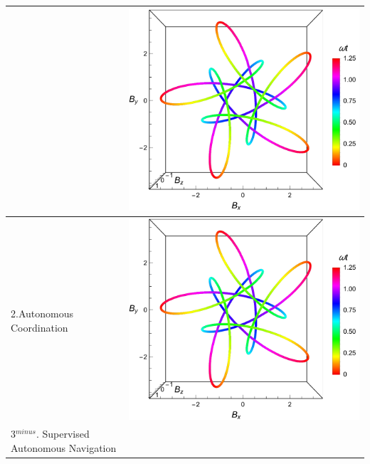 \begin{table}[h!]
\begin{tabular}{ | m{6cm} | m{6cm} | }
      &
      \begin{minipage}{.15\textwidth}
      \includegraphics[width=\linewidth]{figures/5_1.pdf}
    \end{minipage}
    \\  \hline
      2.Autonomous Coordination
    
      &
      \begin{minipage}{.15\textwidth}
      \includegraphics[width=\linewidth]{figures/5_1.pdf}
    \end{minipage}
    \\  \hline
      3$^{minus}$. Supervised  Autonomous  Navigation  
    

\end{tabular}
\end{table}
